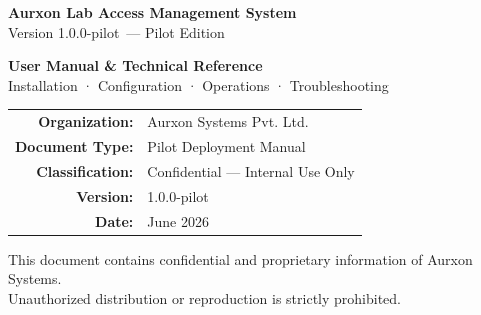 \documentclass[12pt, a4paper, twoside]{report}
\newcommand{\alamsversion}{1.0.0-pilot}
\begin{document}
\begin{titlepage}
\pagecolor{aurxondark}
\color{white}
\begin{center}
\vspace*{3cm}


\vspace{1.5cm}
{\fontsize{26}{30}\selectfont\textbf{Aurxon Lab Access Management System}}\\[0.5cm]
{\large\color{aurxongray} Version \alamsversion\ — Pilot Edition}\\[2cm]


\vspace{1cm}
{\LARGE\textbf{User Manual \& Technical Reference}}\\[0.4cm]
{\normalsize\color{aurxongray} Installation · Configuration · Operations · Troubleshooting}

\vfill

\begin{tabular}{rl}
  \textbf{Organization:} & Aurxon Systems Pvt. Ltd.\\
  \textbf{Document Type:} & Pilot Deployment Manual\\
  \textbf{Classification:} & \textcolor{aurxonamber}{Confidential — Internal Use Only}\\
  \textbf{Version:} & \alamsversion\\
  \textbf{Date:} & June 2026\\
\end{tabular}

\vspace{1.5cm}
\small\color{aurxongray}
This document contains confidential and proprietary information of Aurxon Systems.\\
Unauthorized distribution or reproduction is strictly prohibited.
\end{center}
\end{titlepage}

\nopagecolor
\color{black}
\end{document}
